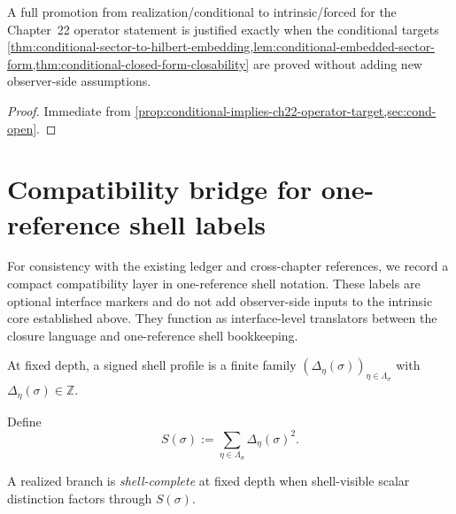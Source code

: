 \begin{corollary}
\label{cor:conditional-promotion-criterion}
A full promotion from realization/conditional to intrinsic/forced for the
Chapter~22 operator statement is justified exactly when the conditional
targets
\cref{thm:conditional-sector-to-hilbert-embedding,lem:conditional-embedded-sector-form,thm:conditional-closed-form-closability}
are proved without adding new observer-side assumptions.
\end{corollary}

\begin{proof}
Immediate from
\cref{prop:conditional-implies-ch22-operator-target,sec:cond-open}.
\end{proof}

\section{Compatibility bridge for one-reference shell labels}
\label{sec:shell-one-reference-compat}

For consistency with the existing ledger and cross-chapter references, we
record a compact compatibility layer in one-reference shell notation.
These labels are optional interface markers and do not add observer-side
inputs to the intrinsic core established above.
They function as interface-level translators between the closure
language and one-reference shell bookkeeping.

\begin{definition}
\label{def:shell-signed-profile}
At fixed depth, a signed shell profile is a finite family
\((\Delta_\eta(\sigma))_{\eta\in\Lambda_\sigma}\) with
\(\Delta_\eta(\sigma)\in\mathbb Z\).
\end{definition}

\begin{definition}
\label{def:shell-S}
Define
\[
  S(\sigma):=\sum_{\eta\in\Lambda_\sigma}\Delta_\eta(\sigma)^2.
\]
\end{definition}

\begin{definition}
\label{def:shell-completeness}
A realized branch is \emph{shell-complete} at fixed depth when
shell-visible scalar distinction factors through \(S(\sigma)\).
\end{definition}

